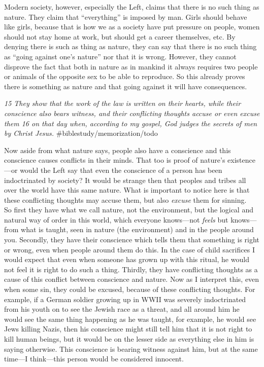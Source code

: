 Modern society, however, especially the Left, claims that there is no
such thing as nature. They claim that ``everything'' is imposed by man.
Girls should behave like girls, because that is how we as a society have
put pressure on people, women should not stay home at work, but should
get a career themselves, etc. By denying there is such as thing as
nature, they can say that there is no such thing as ``going against
one's nature'' nor that it is wrong. However, they cannot disprove the
fact that both in nature as in mankind it always requires two people or
animals of the opposite sex to be able to reproduce. So this already
proves there is something as nature and that going against it will have
consequences.

\emph{15 They show that the work of the law is written on their
hearts, while their conscience also bears witness, and their conflicting
thoughts accuse or even excuse them 16 on that day when, according to
my gospel, God judges the secrets of men by Christ Jesus.}
\#biblestudy/memorization/todo

Now aside from what nature says, people also have a conscience and this
conscience causes conflicts in their minds. That too is proof of
nature's existence---or would the Left say that even the conscience of a
person has been indoctrinated by society? It would be strange then that
peoples and tribes all over the world have this same nature. What is
important to notice here is that these conflicting thoughts may accuse
them, but also \emph{excuse} them for sinning.\\
So first they have what we call nature, not the environment, but the
logical and natural way of order in this world, which everyone
knows---not \emph{feels} but knows---from what is taught, seen in nature
(the environment) and in the people around you. Secondly, they have
their conscience which tells them that something is right or wrong, even
when people around them do this. In the case of child sacrifices I would
expect that even when someone has grown up with this ritual, he would
not feel it is right to do such a thing. Thirdly, they have conflicting
thoughts as a cause of this conflict between conscience and nature. Now
as I interpret this, even when some sin, they could be excused, because
of these conflicting thoughts. For example, if a German soldier growing
up in WWII was severely indoctrinated from his youth on to see the
Jewish race as a threat, and all around him he would see the same thing
happening as he was taught, for example, he would see Jews killing
Nazis, then his conscience might still tell him that it is not right to
kill human beings, but it would be on the lesser side as everything else
in him is saying otherwise. This conscience is bearing witness against
him, but at the same time---I think---this person would be considered
innocent.

